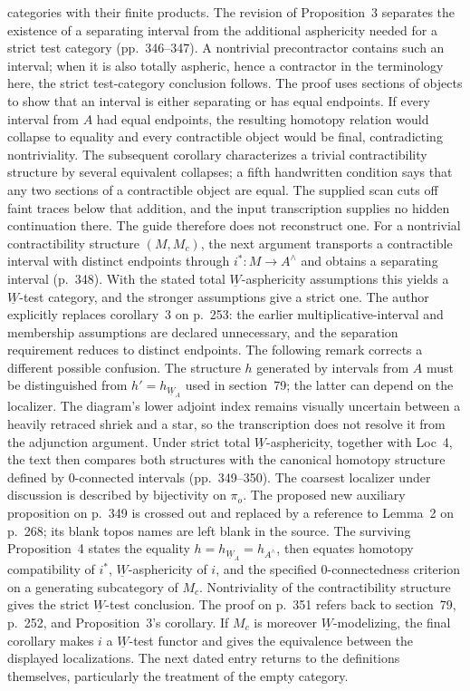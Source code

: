\documentclass[10pt,oneside]{book}
\begin{document}
categories with their finite products. The revision of Proposition~3 separates the existence of a separating interval from the additional asphericity needed for a strict test category (pp.~346--347). A nontrivial precontractor contains such an interval; when it is also totally aspheric, hence a contractor in the terminology here, the strict test-category conclusion follows. The proof uses sections of objects to show that an interval is either separating or has equal endpoints. If every interval from $A$ had equal endpoints, the resulting homotopy relation would collapse to equality and every contractible object would be final, contradicting nontriviality. The subsequent corollary characterizes a trivial contractibility structure by several equivalent collapses; a fifth handwritten condition says that any two sections of a contractible object are equal. The supplied scan cuts off faint traces below that addition, and the input transcription supplies no hidden continuation there. The guide therefore does not reconstruct one. For a nontrivial contractibility structure $(M,M_c)$, the next argument transports a contractible interval with distinct endpoints through $i^*:M\to A^{\wedge}$ and obtains a separating interval (p.~348). With the stated total $\underline W$-asphericity assumptions this yields a $\underline W$-test category, and the stronger assumptions give a strict one. The author explicitly replaces corollary~3 on p.~253: the earlier multiplicative-interval and membership assumptions are declared unnecessary, and the separation requirement reduces to distinct endpoints. The following remark corrects a different possible confusion. The structure $h$ generated by intervals from $A$ must be distinguished from $h'=h_{\underline W_A}$ used in section~79; the latter can depend on the localizer. The diagram's lower adjoint index remains visually uncertain between a heavily retraced shriek and a star, so the transcription does not resolve it from the adjunction argument. Under strict total $\underline W$-asphericity, together with Loc~4, the text then compares both structures with the canonical homotopy structure defined by 0-connected intervals (pp.~349--350). The coarsest localizer under discussion is described by bijectivity on $\pi_o$. The proposed new auxiliary proposition on p.~349 is crossed out and replaced by a reference to Lemma~2 on p.~268; its blank topos names are left blank in the source. The surviving Proposition~4 states the equality $h=h_{\underline W_A}=h_{A^{\wedge}}$, then equates homotopy compatibility of $i^*$, $\underline W$-asphericity of $i$, and the specified 0-connectedness criterion on a generating subcategory of $M_c$. Nontriviality of the contractibility structure gives the strict $\underline W$-test conclusion. The proof on p.~351 refers back to section~79, p.~252, and Proposition~3's corollary. If $M_c$ is moreover $\underline W$-modelizing, the final corollary makes $i$ a $\underline W$-test functor and gives the equivalence between the displayed localizations. The next dated entry returns to the definitions themselves, particularly the treatment of the empty category.
\end{document}
